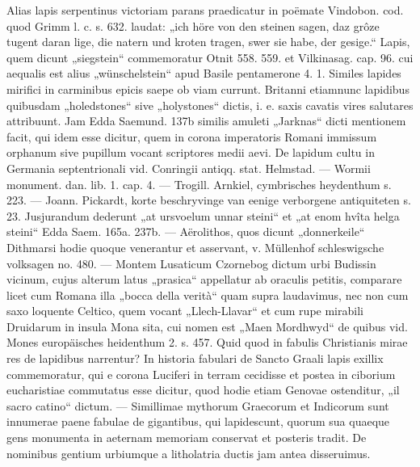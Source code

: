 \documentclass[a4paper, 11pt, oneside, polutonikogreek, german]{article}
\begin{document}
\hspace*{0mm}Alias lapis serpentinus victoriam parans praedicatur in poëmate Vindobon. cod. quod Grimm l. c. s. 632. laudat: „ich höre von den steinen sagen, daz grôze tugent daran lige, die natern und kroten tragen, swer sie habe, der gesige.“ Lapis, quem dicunt „siegstein“ commemoratur Otnit 558. 559. et Vilkinasag. cap. 96. cui aequalis est alius „wünschelstein“ apud Basile pentamerone 4. 1. Similes lapides mirifici in carminibus epicis saepe ob viam currunt. Britanni etiamnunc lapidibus quibusdam „holedstones“ sive „holystones“ dictis, i. e. saxis cavatis vires salutares attribuunt. Jam Edda Saemund. 137b similis amuleti „Jarknas“ dicti mentionem facit, qui idem esse dicitur, quem in corona imperatoris Romani immissum orphanum sive pupillum vocant scriptores medii aevi. De lapidum cultu in Germania septentrionali vid. Conringii antiqq. stat. Helmstad. --- Wormii monument. dan. lib. 1. cap. 4. --- Trogill. Arnkiel, cymbrisches heydenthum s. 223. --- Joann. Pickardt, korte beschryvinge van eenige verborgene antiquiteten s. 23. Jusjurandum dederunt „at ursvoelum unnar steini“ et „at enom hvîta helga steini“ Edda Saem. 165a. 237b. --- Aërolithos, quos dicunt „donnerkeile“ Dithmarsi hodie quoque venerantur et asservant, v. Müllenhof schleswigsche volksagen no. 480. --- Montem Lusaticum Czornebog dictum urbi Budissin vicinum, cujus alterum latus „prasica“ appellatur ab oraculis petitis, comparare licet cum Romana illa „bocca della verità“ quam supra laudavimus, nec non cum saxo loquente Celtico, quem vocant „Llech-Llavar“ et cum rupe mirabili Druidarum in insula Mona sita, cui nomen est „Maen Mordhwyd“ de quibus vid. Mones europäisches heidenthum 2. s. 457. Quid quod in fabulis Christianis mirae res de lapidibus narrentur? In historia fabulari de Sancto Graali lapis exillix commemoratur, qui e corona Luciferi in terram cecidisse et postea in ciborium eucharistiae commutatus esse dicitur, quod hodie etiam Genovae ostenditur, „il sacro catino“ dictum. --- Simillimae mythorum Graecorum et Indicorum sunt innumerae paene fabulae de gigantibus, qui lapidescunt, quorum sua quaeque gens monumenta in aeternam memoriam conservat et posteris tradit. De nominibus gentium urbiumque a litholatria ductis jam antea disseruimus.
\end{document}
